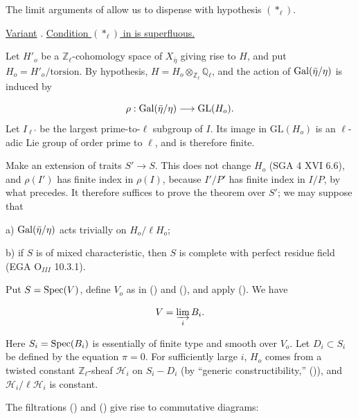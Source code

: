 The limit arguments of  allow us to dispense with hypothesis $(*_\ell)$.

\underline{Variant} . \underline{Condition $(*_\ell)$ in  is superfluous.}

Let $H'_o$ be a $\mathbb{Z}_\ell$-cohomology space of $X_{\bar\eta}$ giving rise to $H$, and put $H_o=H'_o/\text{torsion}$. By hypothesis,
$H=H_o\otimes_{\mathbb{Z}_\ell}\mathbb{Q}_\ell$, and the action of $\operatorname{Gal}(\bar\eta/\eta)$ is induced by

\begin{equation*}
\rho:\operatorname{Gal}(\bar\eta/\eta)\longrightarrow\mathrm{GL}(H_o).
\end{equation*}
Let $I_{\ell'}$ be the largest prime-to-$\ell$ subgroup of $I$. Its image in $\mathrm{GL}(H_o)$ is an $\ell$-adic Lie group of order prime to $\ell$, and is therefore finite.

Make an extension of traits $S'\longrightarrow S$. This does not change $H_o$ (SGA 4 XVI 6.6), and $\rho(I')$ has finite index in $\rho(I)$, because $I'/P'$ has finite index in $I/P$, by what precedes. It therefore suffices to prove the theorem over $S'$; we may suppose that

a) $\operatorname{Gal}(\bar\eta/\eta)$ acts trivially on $H_o/\ell H_o$;

b) if $S$ is of mixed characteristic, then $S$ is complete with perfect residue field (EGA $\mathrm{O}_{III}$ 10.3.1).

Put $S=\operatorname{Spec}(V)$, define $V_o$ as in () and (), and apply (). We have

\begin{equation*}
V=\varinjlim_i B_i.
\end{equation*}


Here $S_i=\operatorname{Spec}(B_i)$ is essentially of finite type and smooth over $V_o$. Let $D_i\subset S_i$ be defined by the equation $\pi=0$. For sufficiently large $i$, $H_o$ comes from a twisted constant $\mathbb{Z}_\ell$-sheaf $\mathcal H_i$ on $S_i-D_i$ (by ``generic constructibility,'' ()), and $\mathcal H_i/\ell\mathcal H_i$ is constant.

The filtrations () and () give rise to commutative diagrams:

